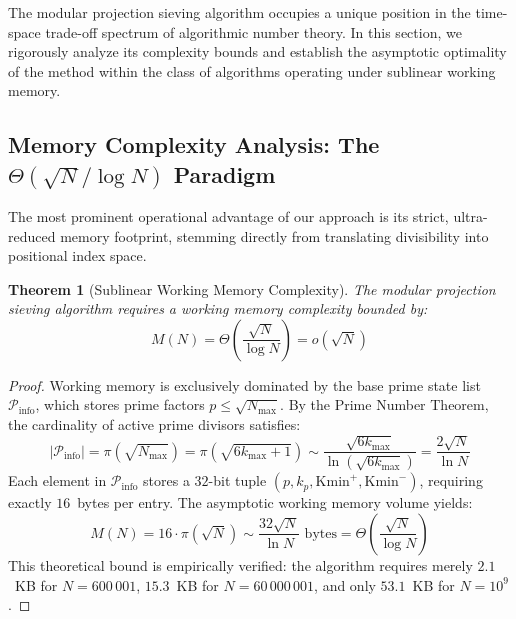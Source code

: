 \documentclass{article}
\numberwithin{equation}{section}
\theoremstyle{plain}
\newtheorem{theorem}{Theorem}[section]
\theoremstyle{definition}
\begin{document}
The modular projection sieving algorithm occupies a unique position in the time-space trade-off spectrum of algorithmic number theory. In this section, we rigorously analyze its complexity bounds and establish the asymptotic optimality of the method within the class of algorithms operating under sublinear working memory.

\subsection{Memory Complexity Analysis: The $\Theta(\sqrt{N}/\log N)$ Paradigm}

The most prominent operational advantage of our approach is its strict, ultra-reduced memory footprint, stemming directly from translating divisibility into positional index space.

\begin{theorem}[Sublinear Working Memory Complexity]
\label{thm:complejidad-memoria}
The modular projection sieving algorithm requires a working memory complexity bounded by:
\begin{equation}
M(N) = \Theta\left(\frac{\sqrt{N}}{\log N}\right) = o(\sqrt{N})
\end{equation}
\end{theorem}

\begin{proof}
Working memory is exclusively dominated by the base prime state list $\mathcal{P}_{\text{info}}$, which stores prime factors $p \le \sqrt{N_{\max}}$. By the Prime Number Theorem, the cardinality of active prime divisors satisfies:
\begin{equation}
|\mathcal{P}_{\text{info}}| = \pi(\sqrt{N_{\max}}) = \pi(\sqrt{6k_{\max}+1}) \sim \frac{\sqrt{6k_{\max}}}{\ln(\sqrt{6k_{\max}})} = \frac{2\sqrt{N}}{\ln N}
\end{equation}
Each element in $\mathcal{P}_{\text{info}}$ stores a $32$-bit tuple $(p, k_p, \mathrm{Kmin}^+, \mathrm{Kmin}^-)$, requiring exactly $16$~bytes per entry. The asymptotic working memory volume yields:
\begin{equation}
M(N) = 16 \cdot \pi(\sqrt{N}) \sim \frac{32 \sqrt{N}}{\ln N} \text{ bytes} = \Theta\left(\frac{\sqrt{N}}{\log N}\right)
\end{equation}
This theoretical bound is empirically verified: the algorithm requires merely $2.1$~KB for $N=600\,001$, $15.3$~KB for $N=60\,000\,001$, and only $53.1$~KB for $N=10^9$.
\end{proof}
\end{document}
